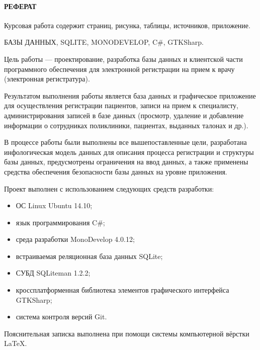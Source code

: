 \newpage
{}
\paragraph{\hfill РЕФЕРАТ \hfill}
Курсовая работа содержит  страниц,  рисунка,  таблицы,  источников,  приложение.

БАЗЫ ДАННЫХ, SQLITE, MONODEVELOP, C\#, GTKSharp.

Цель работы --- проектирование, разработка базы данных и клиентской части программного обеспечения для электронной регистрации на прием к врачу (электронная регистратура).

Результатом выполнения работы является база данных и графическое приложение для осуществления регистрации пациентов, записи на прием к специалисту, администрирования записей в базе данных (просмотр, удаление и добавление информации о сотрудниках поликлиники, пациентах, выданных талонах и др.).

В процессе работы были выполнены все вышепоставленные цели, разработана инфологическая модель данных для описания процесса регистрации и структуры базы данных, предусмотрены ограничения на ввод данных, а также применены средства обеспечения безопасности базы данных на уровне приложения.

Проект выполнен с использованием следующих средств разработки:
\begin{itemize}
  \item ОС Linux Ubuntu 14.10;
  \item язык программирования C\#;
  \item среда разработки MonoDevelop 4.0.12;
  \item встраиваемая реляционная база данных SQLite;
  \item СУБД SQLiteman 1.2.2;
  \item кроссплатформенная библиотека элементов графического интерфейса GTKSharp;
  \item система контроля версий Git.
\end{itemize}

Пояснительная записка выполнена при помощи системы компьютерной вёрстки \LaTeX.
